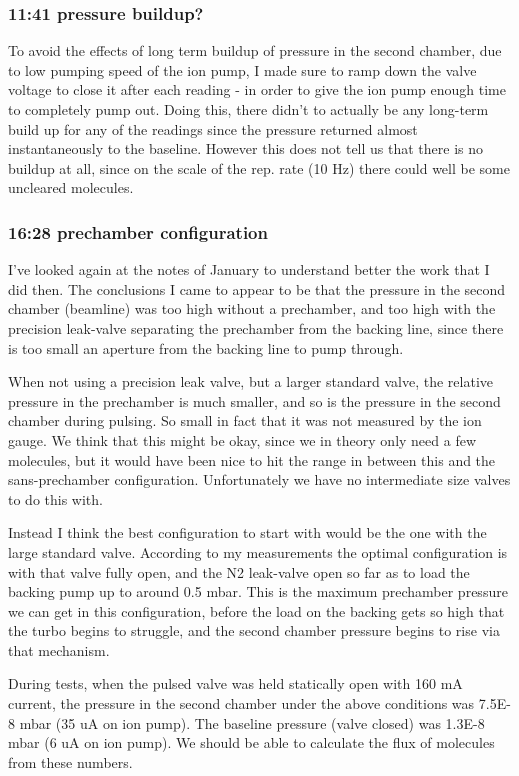 \documentclass[11pt]{article}
\begin{document}
\subsubsection*{11:41 pressure buildup?}
\label{sec-3-1-2}

To avoid the effects of long term buildup of pressure in the second
chamber, due to low pumping speed of the ion pump, I made sure to ramp
down the valve voltage to close it after each reading - in order to
give the ion pump enough time to completely pump out. Doing this,
there didn't to actually be any long-term build up for any of the
readings since the pressure returned almost instantaneously to the
baseline. However this does not tell us that there is no buildup at
all, since on the scale of the rep. rate (10 Hz) there could well be
some uncleared molecules. 
\subsubsection*{16:28 prechamber configuration}
\label{sec-3-1-3}

I've looked again at the notes of January to understand better the
work that I did then. The conclusions I came to appear to be that the
pressure in the second chamber (beamline) was too high without a
prechamber, and too high with the precision leak-valve separating the
prechamber from the backing line, since there is too small an aperture
from the backing line to pump through.

When not using a precision leak valve, but a larger standard valve,
the relative pressure in the prechamber is much smaller, and so is the
pressure in the second chamber during pulsing. So small in fact that
it was not measured by the ion gauge. We think that this might be
okay, since we in theory only need a few molecules, but it would have
been nice to hit the range in between this and the sans-prechamber
configuration. Unfortunately we have no intermediate size valves to do
this with.

Instead I think the best configuration to start with would be the one
with the large standard valve. According to my measurements the
optimal configuration is with that valve fully open, and the N2
leak-valve open so far as to load the backing pump up to around 0.5
mbar. This is the maximum prechamber pressure we can get in this
configuration, before the load on the backing gets so high that the
turbo begins to struggle, and the second chamber pressure begins to
rise via that mechanism. 

During tests, when the pulsed valve was held statically open with 160
mA current, the pressure in the second chamber under the above
conditions was 7.5E-8 mbar (35 uA on ion pump). The baseline pressure
(valve closed) was 1.3E-8 mbar (6 uA on ion pump). We should be able
to calculate the flux of molecules from these numbers.
\end{document}
